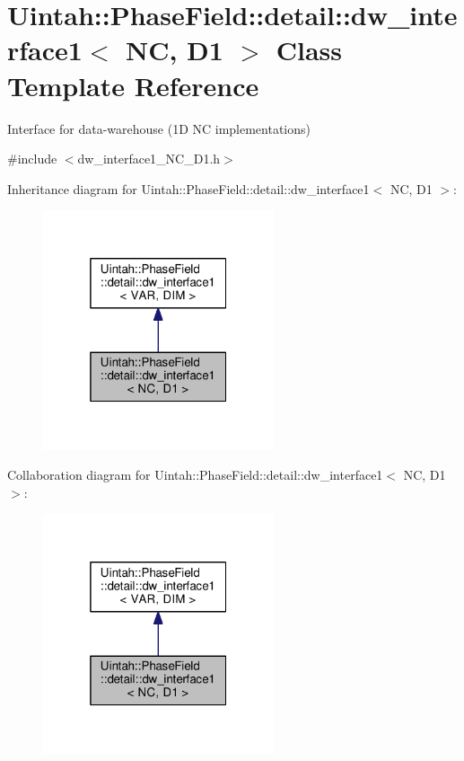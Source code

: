 \hypertarget{classUintah_1_1PhaseField_1_1detail_1_1dw__interface1_3_01NC_00_01D1_01_4}{}\section{Uintah\+:\+:Phase\+Field\+:\+:detail\+:\+:dw\+\_\+interface1$<$ NC, D1 $>$ Class Template Reference}
\label{classUintah_1_1PhaseField_1_1detail_1_1dw__interface1_3_01NC_00_01D1_01_4}


Interface for data-\/warehouse (1D NC implementations)  




{\ttfamily \#include $<$dw\+\_\+interface1\+\_\+\+N\+C\+\_\+\+D1.\+h$>$}



Inheritance diagram for Uintah\+:\+:Phase\+Field\+:\+:detail\+:\+:dw\+\_\+interface1$<$ NC, D1 $>$\+:\nopagebreak
\begin{figure}[H]
\begin{center}
\leavevmode
\includegraphics[width=193pt]{classUintah_1_1PhaseField_1_1detail_1_1dw__interface1_3_01NC_00_01D1_01_4__inherit__graph}
\end{center}
\end{figure}


Collaboration diagram for Uintah\+:\+:Phase\+Field\+:\+:detail\+:\+:dw\+\_\+interface1$<$ NC, D1 $>$\+:\nopagebreak
\begin{figure}[H]
\begin{center}
\leavevmode
\includegraphics[width=193pt]{classUintah_1_1PhaseField_1_1detail_1_1dw__interface1_3_01NC_00_01D1_01_4__coll__graph}
\end{center}
\end{figure}
